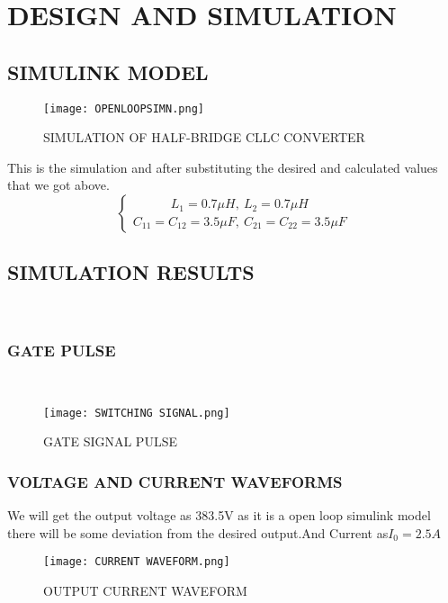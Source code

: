 \documentclass{book}
\begin{document}
          \chapter{DESIGN AND SIMULATION}
          \section{SIMULINK MODEL}
           \begin{figure}[ht]
		\centering
		\texttt{[image: OPENLOOPSIMN.png]} %
		\caption{ SIMULATION OF HALF-BRIDGE CLLC CONVERTER}
	\end{figure}
    This is the simulation and after substituting the desired and calculated values that we got above.\\
    \begin{equation*} \begin{cases} \qquad\quad L_{1}=0.7\mu H, \ L_{2}=0.7\mu H\\ C_{11}=C_{12}=3.5\mu F, \ C_{21}=C_{22}=3.5\mu F \end{cases}\end{equation*}
	\section{SIMULATION RESULTS}
    \\[1CM]
    \subsection{GATE PULSE}
    \\[1CM]
     \begin{figure}[ht]
		\centering
		\texttt{[image: SWITCHING SIGNAL.png]} %
		\caption{ GATE  SIGNAL PULSE}
        
	\end{figure}
    
    \subsection{VOLTAGE AND CURRENT WAVEFORMS}
    
    We will get the output voltage as 383.5V as it is a open loop simulink model there will be some deviation from the desired output.And Current as\(I_{0} = 2.5A\) 
	
    
	\begin{figure}[ht]
		\centering
		\texttt{[image: CURRENT WAVEFORM.png]} %
		\caption{OUTPUT CURRENT WAVEFORM}
		\label{fig:last_31}
		
	\end{figure}
\end{document}
